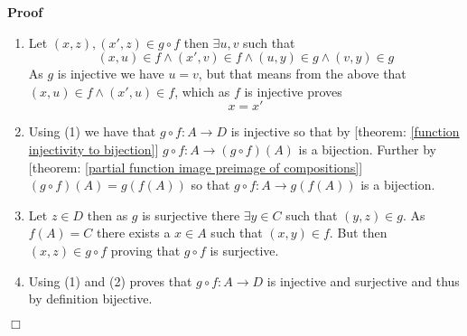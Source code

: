 \documentclass{book}
\newenvironment{proof}{\noindent\textbf{Proof\ }}{\hspace*{\fill}$\Box$\medskip}
\begin{document}
\begin{proof}
  
  \begin{enumerate}
    \item Let $(x, z), (x', z) \in g \circ f$ then $\exists u, v$ such that
    \[ (x, u) \in f \wedge (x', v) \in f \wedge (u, y) \in g \wedge (v, y) \in
       g \]
    As $g$ is injective we have $u = v$, but that means from the above that
    $(x, u) \in f \wedge (x', u) \in f$, which as $f$ is injective proves
    \[ x = x' \]
    \item Using (1) we have that $g \circ f : A \rightarrow D$ is injective so
    that by [theorem: \ref{function injectivity to bijection}] $g \circ f : A
    \rightarrow (g \circ f) (A)$ is a bijection. Further by [theorem:
    \ref{partial function image preimage of compositions}] $(g \circ f) (A) =
    g (f (A))$ so that $g \circ f : A \rightarrow g (f (A))$ is a bijection.
    
    \item Let $z \in D$ then as $g$ is surjective there $\exists y \in C$ such
    that $(y, z) \in g$. As $f (A) = C$ there exists a $x \in A$ such that
    $(x, y) \in f$. But then $(x, z) \in g \circ f$ proving that $g \circ f$
    is surjective.
    
    \item Using (1) and (2) proves that $g \circ f : A \rightarrow D$ is
    injective and surjective and thus by definition bijective.
    

\end{enumerate}
\end{proof}
\end{document}
